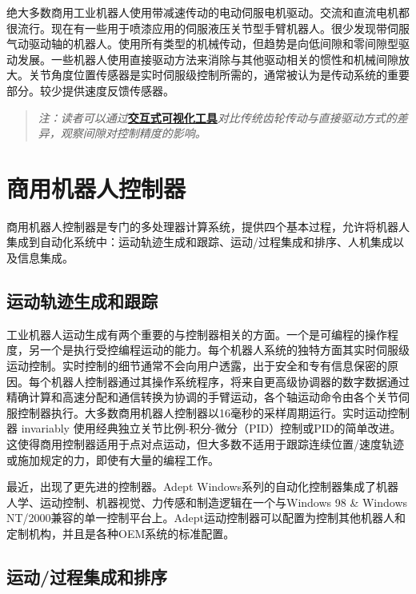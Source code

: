 \documentclass[UTF8,a4paper]{ctexart}
\begin{document}
绝大多数商用工业机器人使用带减速传动的电动伺服电机驱动。交流和直流电机都很流行。现在有一些用于喷漆应用的伺服液压关节型手臂机器人。很少发现带伺服气动驱动轴的机器人。使用所有类型的机械传动，但趋势是向低间隙和零间隙型驱动发展。一些机器人使用直接驱动方法来消除与其他驱动相关的惯性和机械间隙放大。关节角度位置传感器是实时伺服级控制所需的，通常被认为是传动系统的重要部分。较少提供速度反馈传感器。

\begin{quote}
\textit{注：读者可以通过}\href{https://frankjie09.github.io/Robot-Manipulator-Control-CN/figures/Gear_Drive_Comparison.html}{\textbf{交互式可视化工具}}\textit{对比传统齿轮传动与直接驱动方式的差异，观察间隙对控制精度的影响。}
\end{quote}

\section{商用机器人控制器}

商用机器人控制器是专门的多处理器计算系统，提供四个基本过程，允许将机器人集成到自动化系统中：运动轨迹生成和跟踪、运动/过程集成和排序、人机集成以及信息集成。

\subsection{运动轨迹生成和跟踪}

工业机器人运动生成有两个重要的与控制器相关的方面。一个是可编程的操作程度，另一个是执行受控编程运动的能力。每个机器人系统的独特方面其实时伺服级运动控制。实时控制的细节通常不会向用户透露，出于安全和专有信息保密的原因。每个机器人控制器通过其操作系统程序，将来自更高级协调器的数字数据通过精确计算和高速分配和通信转换为协调的手臂运动，各个轴运动命令由各个关节伺服控制器执行。大多数商用机器人控制器以16毫秒的采样周期运行。实时运动控制器 invariably 使用经典独立关节比例-积分-微分（PID）控制或PID的简单改进。这使得商用控制器适用于点对点运动，但大多数不适用于跟踪连续位置/速度轨迹或施加规定的力，即使有大量的编程工作。

最近，出现了更先进的控制器。Adept Windows系列的自动化控制器集成了机器人学、运动控制、机器视觉、力传感和制造逻辑在一个与Windows 98 \& Windows NT/2000兼容的单一控制平台上。Adept运动控制器可以配置为控制其他机器人和定制机构，并且是各种OEM系统的标准配置。

\subsection{运动/过程集成和排序}
\end{document}
